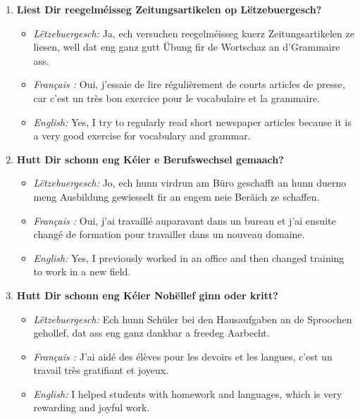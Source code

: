 \begin{enumerate}
    \item \textbf{Liest Dir reegelméisseg Zeitungsartikelen op Lëtzebuergesch?}
    \begin{itemize}
        \item \textit{Lëtzebuergesch:} Ja, ech versuchen reegelméisseg kuerz Zeitungsartikelen ze liesen, well dat eng ganz gutt Übung fir de Wortschaz an d'Grammaire ass.
        \item \textit{Français :} Oui, j'essaie de lire régulièrement de courts articles de presse, car c'est un très bon exercice pour le vocabulaire et la grammaire.
        \item \textit{English:} Yes, I try to regularly read short newspaper articles because it is a very good exercise for vocabulary and grammar.
    \end{itemize}

    \item \textbf{Hutt Dir schonn eng Kéier e Berufswechsel gemaach?}
    \begin{itemize}
        \item \textit{Lëtzebuergesch:} Jo, ech hunn virdrun am Büro geschafft an hunn duerno meng Ausbildung gewiesselt fir an engem neie Beräich ze schaffen.
        \item \textit{Français :} Oui, j'ai travaillé auparavant dans un bureau et j'ai ensuite changé de formation pour travailler dans un nouveau domaine.
        \item \textit{English:} Yes, I previously worked in an office and then changed training to work in a new field.
    \end{itemize}

    \item \textbf{Hutt Dir schonn eng Kéier Nohëllef ginn oder kritt?}
    \begin{itemize}
        \item \textit{Lëtzebuergesch:} Ech hunn Schüler bei den Hausaufgaben an de Sproochen gehollef, dat ass eng ganz dankbar a freedeg Aarbecht.
        \item \textit{Français :} J'ai aidé des élèves pour les devoirs et les langues, c'est un travail très gratifiant et joyeux.
        \item \textit{English:} I helped students with homework and languages, which is very rewarding and joyful work.
    \end{itemize}


\end{enumerate}
